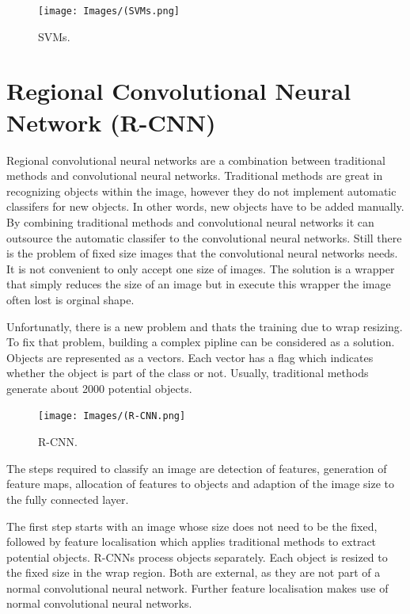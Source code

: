 \documentclass[a4paper,13pt,twoside]{book}
\begin{document}
\begin{figure}[H]
  \texttt{[image: Images/(SVMs.png]}
  \caption{SVMs.}
  \label{fig:SVMs}
\end{figure}

\section{Regional Convolutional Neural Network (R-CNN)}

Regional convolutional neural networks are a combination between traditional methods and convolutional neural networks.
Traditional methods are great in recognizing objects within the image, however they do not implement automatic classifers for new objects. In other words, new objects have to be added manually. By combining traditional methods and convolutional neural networks it can outsource the automatic classifer to the convolutional neural networks. Still there is the problem of fixed size images that the convolutional neural networks needs. It is not convenient to only accept one size of images. The solution is a wrapper that simply reduces the size of an image but in execute this wrapper the image often lost is orginal shape.

Unfortunatly, there is a new problem and thats the training due to wrap resizing. To fix that problem, building a complex pipline can be considered as a solution. Objects are represented as a vectors. Each vector has a flag which indicates whether the object is part of the class or not. Usually, traditional methods generate about 2000 potential objects.


\begin{figure}[H]
  \texttt{[image: Images/(R-CNN.png]}
  \caption{R-CNN.}
  \label{fig:R-CNN}
\end{figure}

The steps required to classify an image are detection of features, generation of feature maps, allocation of features to objects and adaption of the image size to the fully connected layer.

The first step starts with an image whose size does not need to be the fixed, followed by feature localisation which applies traditional methods to extract potential objects. R-CNNs process objects separately. Each object is resized to the fixed size in the wrap region. Both are external, as they are not part of a normal convolutional neural network. Further feature localisation makes use of normal convolutional neural networks.
\end{document}
